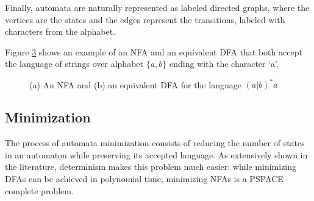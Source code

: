 Finally, automata are naturally represented as labeled directed graphs, where the vertices are the states and the edges represent the transitions, labeled with characters from the alphabet.

\begin{example}
Figure \ref{fig:nfa_dfa_example} shows an example of an NFA and an equivalent DFA that both accept the language of strings over alphabet $\{a, b\}$ ending with the character `a'.

\begin{figure}[H]
    \centering
    \begin{subfigure}[b]{0.45\textwidth}
        \centering
        \caption{}
        \label{fig:nfa_example}
    \end{subfigure}
    \hfill
    \begin{subfigure}[b]{0.45\textwidth}
        \centering
        \caption{}
        \label{fig:dfa_example}
    \end{subfigure}
    \caption{(a) An NFA and (b) an equivalent DFA for the language $(a|b)^*a$.}
    \label{fig:nfa_dfa_example}
\end{figure}
\end{example}

\subsection{Minimization} \label{sec:hopcroft}
The process of automata minimization consists of reducing the number of states in an automaton while preserving its accepted language. 
As extensively shown in the literature, determinism makes this problem much easier: while minimizing DFAs can be achieved in polynomial time, minimizing NFAs is a PSPACE--complete problem. 

